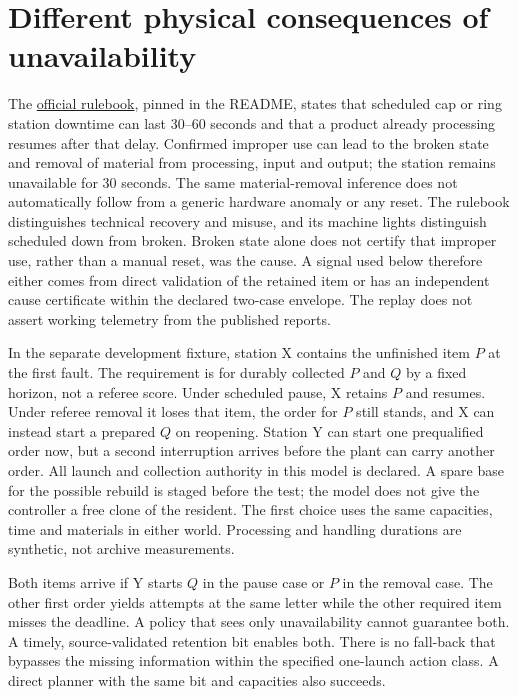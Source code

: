 \documentclass[11pt]{article}
\begin{document}
\section{Different physical consequences of unavailability}
The \href{https://github.com/robocup-logistics/rcll-rulebook/blob/master/rulebook.tex}{official
rulebook}, pinned in the README, states that scheduled cap or ring
station downtime can last 30--60 seconds and that a product already
processing resumes after that delay. Confirmed improper use can
lead to the broken state and removal of material from processing,
input and output; the station remains unavailable for 30 seconds.
The same material-removal inference does not automatically follow
from a generic hardware anomaly or any reset. The rulebook
distinguishes technical recovery and misuse, and its machine lights
distinguish scheduled down from broken. Broken state alone does
not certify that improper use, rather than a manual reset, was the
cause. A signal used below therefore either comes from direct
validation of the retained item or has an independent cause
certificate within the declared two-case envelope. The replay
does not assert working telemetry from the published reports.

In the separate development fixture, station X contains the unfinished
item \(P\) at the first fault. The requirement is for durably
collected \(P\) and \(Q\) by a fixed horizon, not a referee score.
Under scheduled pause, X retains \(P\) and resumes.
Under referee removal it loses that item, the order for \(P\)
still stands, and X can instead start a prepared \(Q\) on reopening.
Station Y can start one prequalified order now, but a second
interruption arrives before the plant can carry another order.
All launch and collection authority in this model is declared.
A spare base for the possible rebuild is staged before the test;
the model does not give the controller a free clone of the resident.
The first choice uses the same capacities, time and materials in either
world. Processing and handling durations are synthetic, not archive
measurements.

Both items arrive if Y starts \(Q\) in the pause case or \(P\) in
the removal case. The other first order yields attempts at
the same letter while the other required item misses the deadline.
A policy that sees only unavailability cannot guarantee both.
A timely, source-validated retention bit enables both.
There is no fall-back that bypasses the missing information within
the specified one-launch action class. A direct planner with the
same bit and capacities also succeeds.
\end{document}

